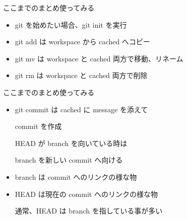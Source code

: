 % 
% 
% 
% 

\begin{frame}[t]{ここまでのまとめ}{使ってみる}

  \begin{itemize}
  \item git を始めたい場合、git init を実行
    \vspace{2ex}

  \item git add は workspace から cached へコピー
    \vspace{2ex}

  \item git mv は workspace と cached 両方で移動、リネーム
    \vspace{2ex}

  \item git rm は workspace と cached 両方で削除
  \end{itemize}

\end{frame}

\begin{frame}[t]{ここまでのまとめ}{使ってみる}
  \begin{itemize}
  \item git commit は cached に message を添えて

    commit を作成

    HEAD が branch を向いている時は

    branch を新しい commit へ向ける
    \vspace{2ex}

  \item branch は commit へのリンクの様な物
    \vspace{2ex}

  \item HEAD は現在の commit へのリンクの様な物

    通常、HEAD は branch を指している事が多い
  \end{itemize}

\end{frame}

